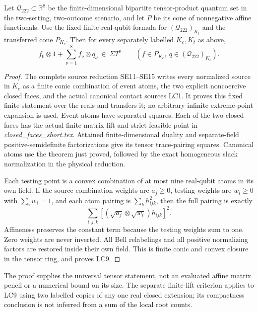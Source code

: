 \begin{corollary}
Let \(\mathcal Q_{222}\subset\mathbb R^8\) be the finite-dimensional
bipartite tensor-product quantum set in the two-setting,
two-outcome scenario, and let \(P\) be its cone of nonnegative
affine functionals.  Use the fixed finite real-qubit formula
for \((\mathcal Q_{222})_{K_t}\) and the transferred cone
\(P_{K_c}\).  Then for every separately labelled \(K_c,K_t\)
as above,
\[
 f_0\otimes1+\sum_{\nu=1}^8 f_\nu\otimes q_\nu
       \ \in\ \Sigma T^2
 \qquad
 (f\in P_{K_c},\ q\in(\mathcal Q_{222})_{K_t}).
\tag{LC9}
\]
\end{corollary}

\begin{proof}
The complete source reduction SE11--SE15 writes every normalized
source in \(K_c\) as a finite conic combination of event atoms,
the two explicit noncoercive closed faces, and the actual
canonical contact sources LC1.  It proves this fixed finite
statement over the reals and transfers it; no arbitrary
infinite extreme-point expansion is used.
Event atoms have separated squares.  Each of the two closed
faces has the actual finite matrix lift and strict feasible
point in \emph{closed\_faces\_short.tex}.
Attained finite-dimensional duality and separate-field
positive-semidefinite factorizations give its tensor
trace-pairing squares.  Canonical atoms use the theorem
just proved, followed by the exact homogeneous slack
normalization in the physical reduction.

Each testing point is a convex combination of at most nine
real-qubit atoms in its own field.  If the source combination
weights are \(a_j\geq0\), testing weights are \(w_i\geq0\)
with \(\sum_iw_i=1\), and each atom pairing is
\(\sum_k h_{ijk}^2\), then the full pairing is exactly
\[
       \sum_{i,j,k}
        \left[(\sqrt{a_j}\otimes\sqrt{w_i})h_{ijk}\right]^2 .
\tag{LC10}
\]
Affineness preserves the constant term because the testing
weights sum to one.  Zero weights are never inverted.
All Bell relabelings and all positive normalizing factors
are restored inside their own field.  This is finite conic
and convex closure in the tensor ring, and proves LC9.
\end{proof}

The proof supplies the universal tensor statement, not an
evaluated affine matrix pencil or a numerical bound on its
size.  The separate finite-lift criterion applies to LC9
using two labelled copies of any one real closed extension;
its compactness conclusion is not inferred from a sum of
the local root counts.

